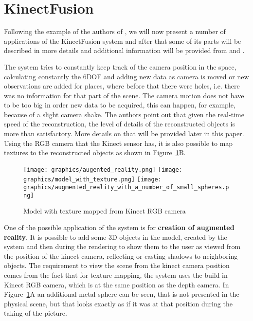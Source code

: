 \documentclass[11pt, a4paper]{article}
\theoremstyle{plain}
\begin{document}
\section{KinectFusion} %
\label{sec:KinectFusion}
  Following the example of the authors of \cite{kinectfusion}, we will now
  present a number of applications of the KinectFusion system and after that
  some of its parts will be described in more details and additional information
  will be provided from \cite{representaion-and-rendering-of-implicit-surfaces}
  and \cite{icp}.

  The system tries to constantly keep track of the camera position in the space,
  calculating constantly the 6DOF and adding new data as camera is moved or new
  observations are added for places, where before that there were holes, i.e.
  there was no information for that part of the scene. The camera motion does
  not have to be too big in order new data to be acquired, this can happen, for
  example, because of a slight camera shake. The authors point out that given
  the real-time speed of the reconstruction, the level of details of the
  reconstructed objects is more than satisfactory. More details on that will be
  provided later in this paper. Using the RGB camera that the Kinect sensor has,
  it is also possible to map textures to the reconstructed objects as shown in
  Figure~\ref{fig:model_with_texture}B.

  \begin{figure}
    \centering
    \texttt{[image: graphics/augented\_reality.png]}
    \texttt{[image: graphics/model\_with\_texture.png]}
    \texttt{[image: graphics/augmented\_reality\_with\_a\_number\_of\_small\_spheres.png]}
    \caption{Model with texture mapped from Kinect RGB camera}
    \label{fig:model_with_texture}
  \end{figure}

  One of the possible application of the system is for \textbf{creation of
  augmented reality}. It is possible to add some 3D objects in the model,
  created by the system and then during the rendering to show them to the user
  as viewed from the position of the kinect camera, reflecting or casting
  shadows to neighboring objects. The requirement to view the scene from the
  kinect camera position comes from the fact that for texture mapping, the
  system uses the build-in Kinect RGB camera, which is at the same position as
  the depth camera.  In Figure~\ref{fig:model_with_texture}A an additional metal
  sphere can be seen, that is not presented in the physical scene, but that
  looks exactly as if it was at that position during the taking of the picture.
\end{document}

